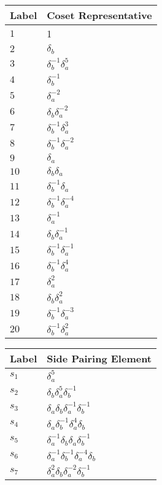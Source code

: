\documentclass{article}
\begin{document}

\begin{center}
\begin{tabular}{ll}
\toprule
Label & Coset Representative\\
\midrule
$1$ & 1 \\
$2$ & $\delta_b^{}$ \\
$3$ & $\delta_b^{-1}\delta_a^{5}$ \\
$4$ & $\delta_b^{-1}$ \\
$5$ & $\delta_a^{-2}$ \\
$6$ & $\delta_b^{}\delta_a^{-2}$ \\
$7$ & $\delta_b^{-1}\delta_a^{3}$ \\
$8$ & $\delta_b^{-1}\delta_a^{-2}$ \\
$9$ & $\delta_a^{}$ \\
$10$ & $\delta_b^{}\delta_a^{}$ \\
$11$ & $\delta_b^{-1}\delta_a^{}$ \\
$12$ & $\delta_b^{-1}\delta_a^{-4}$ \\
$13$ & $\delta_a^{-1}$ \\
$14$ & $\delta_b^{}\delta_a^{-1}$ \\
$15$ & $\delta_b^{-1}\delta_a^{-1}$ \\
$16$ & $\delta_b^{-1}\delta_a^{4}$ \\
$17$ & $\delta_a^{2}$ \\
$18$ & $\delta_b^{}\delta_a^{2}$ \\
$19$ & $\delta_b^{-1}\delta_a^{-3}$ \\
$20$ & $\delta_b^{-1}\delta_a^{2}$ \\
\bottomrule
\end{tabular}
\hfill
\begin{tabular}{ll}
\toprule
Label & Side Pairing Element\\
\midrule
$s_{1}$ & $\delta_a^{5}$ \\
$s_{2}$ & $\delta_b^{}\delta_a^{5}\delta_b^{-1}$ \\
$s_{3}$ & $\delta_a^{}\delta_b^{}\delta_a^{-1}\delta_b^{-1}$ \\
$s_{4}$ & $\delta_a^{}\delta_b^{-1}\delta_a^{4}\delta_b^{}$ \\
$s_{5}$ & $\delta_a^{-1}\delta_b^{}\delta_a^{}\delta_b^{-1}$ \\
$s_{6}$ & $\delta_a^{-1}\delta_b^{-1}\delta_a^{-4}\delta_b^{}$ \\
$s_{7}$ & $\delta_a^{2}\delta_b^{}\delta_a^{-2}\delta_b^{-1}$ \\

\end{tabular}
\end{center}
\end{document}
